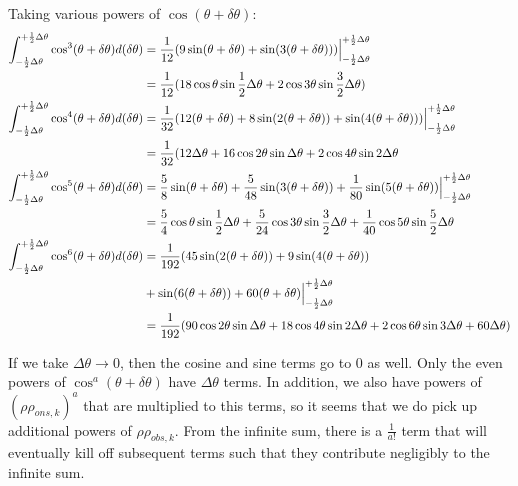 \documentclass[12pt]{article}
\begin{document}
Taking various powers of $\cos(\theta+\delta\theta)$:
	\begin{align}
	\int_{-\frac{1}{2}\Delta\theta}^{+\frac{1}{2}\Delta\theta} \cos^3(\theta+\delta\theta)d(\delta\theta) &= \frac{1}{12}(9\sin(\theta+\delta\theta)+\sin(3(\theta+\delta\theta)))\Big|^{+\frac{1}{2}\Delta\theta}_{-\frac{1}{2}\Delta\theta}\\
	&=\frac{1}{12}(18\cos\theta\sin\frac{1}{2}\Delta\theta + 2\cos3\theta\sin\frac{3}{2}\Delta\theta)\\
	\int_{-\frac{1}{2}\Delta\theta}^{+\frac{1}{2}\Delta\theta} \cos^4(\theta+\delta\theta)d(\delta\theta) &= \frac{1}{32}(12(\theta+\delta\theta)+8\sin(2(\theta+\delta\theta))+\sin(4(\theta+\delta\theta)))\Big|^{+\frac{1}{2}\Delta\theta}_{-\frac{1}{2}\Delta\theta}\\
	&=\frac{1}{32}(12\Delta\theta + 16\cos2\theta\sin\Delta\theta + 2\cos4\theta\sin2\Delta\theta\\
	\int_{-\frac{1}{2}\Delta\theta}^{+\frac{1}{2}\Delta\theta} \cos^5(\theta+\delta\theta)d(\delta\theta) &= \frac{5}{8}\sin(\theta+\delta\theta)+\frac{5}{48}\sin(3(\theta+\delta\theta))+\frac{1}{80}\sin(5(\theta+\delta\theta))\Big|^{+\frac{1}{2}\Delta\theta}_{-\frac{1}{2}\Delta\theta}\\
	&= \frac{5}{4}\cos\theta\sin\frac{1}{2}\Delta\theta+\frac{5}{24}\cos3\theta\sin\frac{3}{2}\Delta\theta+\frac{1}{40}\cos5\theta\sin\frac{5}{2}\Delta\theta\\
	\int_{-\frac{1}{2}\Delta\theta}^{+\frac{1}{2}\Delta\theta} \cos^6(\theta+\delta\theta)d(\delta\theta) &= \frac{1}{192}(45\sin(2(\theta+\delta\theta))+9\sin(4(\theta+\delta\theta))\\ \notag&+\sin(6(\theta+\delta\theta))+60(\theta+\delta\theta)\Big|^{+\frac{1}{2}\Delta\theta}_{-\frac{1}{2}\Delta\theta}\\
	&=\frac{1}{192}(90\cos2\theta\sin\Delta\theta+18\cos4\theta\sin2\Delta\theta+2\cos6\theta\sin3\Delta\theta+60\Delta\theta)
	\end{align}

If we take $\Delta\theta\rightarrow 0$, then the cosine and sine terms go to 0 as well. Only the even powers of $\cos^a(\theta+\delta\theta)$ have $\Delta\theta$ terms. In addition, we also have powers of $(\rho\rho_{ons,k})^a$ that are multiplied to this terms, so it seems that we do pick up additional powers of $\rho\rho_{obs,k}$. From the infinite sum, there is a $\frac{1}{a!}$ term that will eventually kill off subsequent terms such that they contribute negligibly to the infinite sum.
\end{document}
